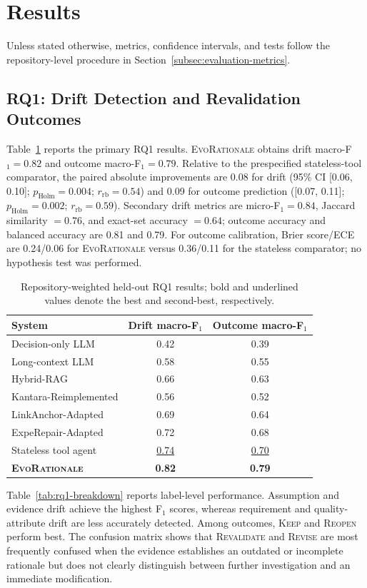 \documentclass[10pt,conference]{IEEEtran}
\begin{document}
\section{Results}
\label{sec:results}
Unless stated otherwise, metrics, confidence intervals, and tests follow the repository-level procedure in Section~\ref{subsec:evaluation-metrics}.
\subsection{RQ1: Drift Detection and Revalidation Outcomes}
\label{subsec:results-rq1}
Table~\ref{tab:rq1-primary} reports the primary RQ1 results. \textsc{EvoRationale} obtains drift macro-F$_1=0.82$ and outcome macro-F$_1=0.79$. Relative to the prespecified stateless-tool comparator, the paired absolute improvements are 0.08 for drift (95\% CI [0.06, 0.10]; $p_{\mathrm{Holm}}=0.004$; $r_{\mathrm{rb}}=0.54$) and 0.09 for outcome prediction ([0.07, 0.11]; $p_{\mathrm{Holm}}=0.002$; $r_{\mathrm{rb}}=0.59$). Secondary drift metrics are micro-F$_1=0.84$, Jaccard similarity $=0.76$, and exact-set accuracy $=0.64$; outcome accuracy and balanced accuracy are 0.81 and 0.79. For outcome calibration, Brier score/ECE are 0.24/0.06 for \textsc{EvoRationale} versus 0.36/0.11 for the stateless comparator; no hypothesis test was performed.
\begin{table}[!t]
\caption{Repository-weighted held-out RQ1 results; bold and underlined values denote the best and second-best, respectively.}
\label{tab:rq1-primary}
\centering
\footnotesize
\renewcommand{\arraystretch}{1.05}
\setlength{\tabcolsep}{4pt}
\begin{tabular}{@{}lcc@{}}
\toprule
\textbf{System}&\textbf{Drift macro-F$_1$}&\textbf{Outcome macro-F$_1$}\\
\midrule
Decision-only LLM&0.42&0.39\\
Long-context LLM&0.58&0.55\\
Hybrid-RAG&0.66&0.63\\
Kantara-Reimplemented&0.56&0.52\\
LinkAnchor-Adapted&0.69&0.64\\
ExpeRepair-Adapted&0.72&0.68\\
Stateless tool agent&\underline{0.74}&\underline{0.70}\\
\textbf{\textsc{EvoRationale}}&\textbf{0.82}&\textbf{0.79}\\
\bottomrule
\end{tabular}
\end{table}
Table~\ref{tab:rq1-breakdown} reports label-level performance. Assumption and evidence drift achieve the highest F$_1$ scores, whereas requirement and quality-attribute drift are less accurately detected. Among outcomes, \textsc{Keep} and \textsc{Reopen} perform best. The confusion matrix shows that \textsc{Revalidate} and \textsc{Revise} are most frequently confused when the evidence establishes an outdated or incomplete rationale but does not clearly distinguish between further investigation and an immediate modification.
\end{document}
